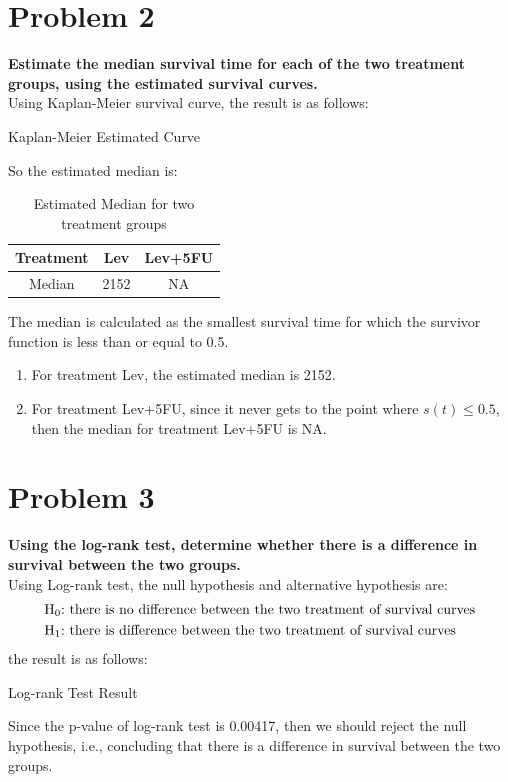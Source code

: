 \documentclass[10pt,letterpaper]{article}
\begin{document}
\section*{Problem 2}
\textbf{Estimate the median survival time for each of the two treatment groups, using the estimated survival curves.}\\

Using Kaplan-Meier survival curve, the result is as follows:
\begin{center}
\small{Kaplan-Meier Estimated Curve}
\end{center}
So the estimated median is:
\begin{table}[H]
\caption{Estimated Median for two treatment groups}
\centering
\begin{tabular*}{0.4\linewidth}{@{\extracolsep{\fill}}ccc}
\hline
Treatment & Lev & Lev+5FU\\
\hline
 Median & 2152 & NA \\
\hline
\end{tabular*}
\end{table}
The median is calculated as the smallest survival time for which the survivor function is less than or equal to 0.5. 
\begin{enumerate}[leftmargin=0cm,itemindent=.5cm,labelwidth=\itemindent,labelsep=0cm,align=left]
\item[\textbullet] For treatment Lev, the estimated median is 2152.
\item[\textbullet] For treatment Lev+5FU, since it never gets to the point where $s(t) \leq 0.5$, then the median for treatment Lev+5FU is NA.
\end{enumerate}
\section*{Problem 3}
\textbf{Using the log-rank test, determine whether there is a difference in survival between the two groups.}\\

Using Log-rank test, the null hypothesis and alternative hypothesis are:
\begin{equation*}
\begin{split}
\text{H\textsubscript{0}:} & \ \text{there is no difference between the two treatment of survival curves} \\
\text{H\textsubscript{1}:} & \ \text{there is difference between the two treatment of survival curves}\\
\end{split}
\end{equation*}
the result is as follows:
\begin{center}
\small{Log-rank Test Result}
\end{center}
Since the p-value of log-rank test is 0.00417, then we should reject the null hypothesis, i.e., concluding that there is a difference in survival between the two groups.
\end{document}
